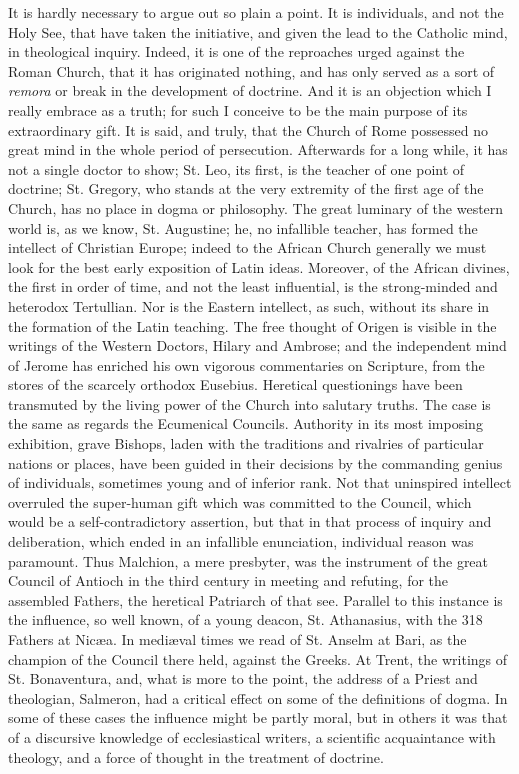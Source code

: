 It is
hardly necessary to argue out so plain a point. It is
individuals, and not the Holy See, that have taken the
initiative, and given the lead to the Catholic mind, in
theological inquiry. Indeed, it is one of the reproaches urged against
the Roman Church, that it has originated nothing, and has
only served as a sort of \emph{remora} or break in the development of doctrine.
And it is an objection which I really embrace as a truth; for
such I conceive to be the main purpose of its extraordinary gift. It is
said, and truly, that the Church of Rome possessed no great mind in the
whole period of persecution. Afterwards for a long while, it has
not a single doctor to show; St. Leo, its first, is the teacher of one
point of doctrine; St. Gregory, who stands at the very extremity of the
first age of the Church, has no place in dogma or philosophy. The great
luminary of the western world is, as we know, St. Augustine; he, no
infallible teacher, has formed the intellect of Christian
Europe; indeed to the African Church generally we must look for the best
early exposition of Latin ideas. Moreover, of the African divines,
the first in order of time, and not the least influential, is the
strong-minded and heterodox Tertullian. Nor is the Eastern intellect, as
such, without its share in the formation of the Latin teaching. The free
thought of Origen is visible in the writings of the Western Doctors,
Hilary and Ambrose; and the independent mind of Jerome has enriched his
own vigorous commentaries on Scripture, from the stores of the scarcely
orthodox Eusebius. Heretical questionings have been transmuted by the
living power of the Church into salutary truths. The case is the
same as regards the Ecumenical Councils. Authority in its most imposing
exhibition, grave Bishops, laden with the traditions and rivalries of
particular nations or places, have been guided in their decisions by the
commanding genius of individuals, sometimes young and of inferior rank.
Not that uninspired intellect overruled the super-human gift which was
committed to the Council, which would be a self-contradictory assertion,
but that in that process of inquiry and deliberation, which ended in an
infallible enunciation, individual reason was paramount. Thus Malchion,
a mere presbyter, was the instrument of the great Council of Antioch in
the third century in meeting and refuting, for the assembled Fathers,
the heretical Patriarch of that see. Parallel to this instance is the influence, so well
known, of a young deacon, St. Athanasius, with the 318 Fathers at Nicæa. In
mediæval times we read
of St.
Anselm at Bari, as the champion of the Council there held, against
the Greeks. At Trent, the writings of St. Bonaventura,
and, what is more to the point, the address of a Priest and theologian,
Salmeron, had a critical effect on some of the definitions
of dogma. In some of these cases
the influence might be partly moral, but in others it was
that of a discursive knowledge of ecclesiastical writers, a scientific
acquaintance with theology, and a force of thought in the treatment of
doctrine.

